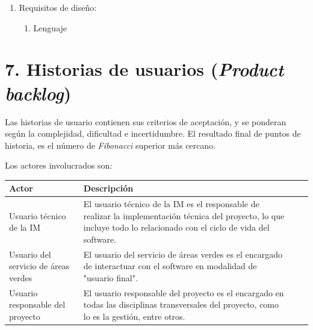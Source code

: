 \documentclass[
11pt, %
]{charter}
\begin{document}
\begin{enumerate}
  \item Requisitos de diseño:
        \begin{enumerate}
          \item Lenguaje
        \end{enumerate}
\end{enumerate}

\section{7. Historias de usuarios (\textit{Product backlog})}
\label{sec:backlog}

Las historias de usuario contienen sus criterios de aceptación, y se ponderan según la complejidad, dificultad e incertidumbre.
El resultado final de puntos de historia, es el número de \textit{Fibonacci} superior más cercano.

Los actores involucrados son:

\begin{table}[ht]
  \begin{tabularx}{\linewidth}{@{}|l|X|X|l|@{}}
    \hline
    \rowcolor[HTML]{C0C0C0}
    Actor                                & Descripción                                                                                                                                                             \\ \hline
    Usuario técnico de la IM             & El usuario técnico de la IM es el responsable de realizar la implementación técnica del proyecto, lo que incluye todo lo relacionado con el ciclo de vida del software. \\ \hline
    Usuario del servicio de áreas verdes & El usuario del servicio de áreas verdes es el encargado de interactuar con el software en modalidad de "usuario final".                                                 \\ \hline
    Usuario responsable del proyecto     & El usuario responsable del proyecto es el encargado en todas las disciplinas transversales del proyecto, como lo es la gestión, entre otros.                            \\ \hline
  \end{tabularx}
\end{table}
\end{document}
